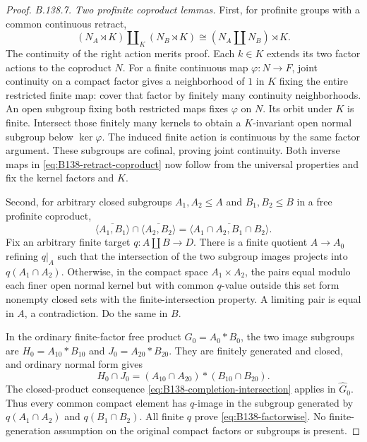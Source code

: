 \begin{proof}
\emph{B.138.7. Two profinite coproduct lemmas.}
First, for profinite groups with a common continuous retract,
\begin{equation}\label{eq:B138-retract-coproduct}
(N_A\rtimes K)\amalg_K(N_B\rtimes K)
       \cong(N_A\amalg N_B)\rtimes K.
\end{equation}
The continuity of the right action merits proof. Each $k\in K$
extends its two factor actions to the coproduct $N$. For a finite
continuous map $\varphi:N\to F$, joint continuity on a compact
factor gives a neighborhood of $1$ in $K$ fixing the entire restricted
finite map: cover that factor by finitely many continuity neighborhoods.
An open subgroup fixing both restricted maps fixes $\varphi$ on $N$.
Its orbit under $K$ is finite. Intersect those finitely many kernels
to obtain a $K$-invariant open normal subgroup below $\ker\varphi$.
The induced finite action is continuous by the same factor argument.
These subgroups are cofinal, proving joint continuity. Both inverse
maps in \eqref{eq:B138-retract-coproduct} now follow from the
universal properties and fix the kernel factors and $K$.

Second, for arbitrary closed subgroups $A_1,A_2\le A$ and
$B_1,B_2\le B$ in a free profinite coproduct,
\begin{equation}\label{eq:B138-factorwise}
\overline{\langle A_1,B_1\rangle}\cap
\overline{\langle A_2,B_2\rangle}
=\overline{\langle A_1\cap A_2,B_1\cap B_2\rangle}.
\end{equation}
Fix an arbitrary finite target $q:A\amalg B\to D$.
There is a finite quotient $A\to A_0$ refining $q|_A$ such that
the intersection of the two subgroup images projects into
$q(A_1\cap A_2)$. Otherwise, in the compact space $A_1\times A_2$,
the pairs equal modulo each finer open normal kernel but with common
$q$-value outside this set form nonempty closed sets with the
finite-intersection property. A limiting pair is equal in $A$,
a contradiction. Do the same in $B$.

In the ordinary finite-factor free product $G_0=A_0*B_0$, the
two image subgroups are $H_0=A_{10}*B_{10}$ and $J_0=A_{20}*B_{20}$.
They are finitely generated and closed, and ordinary normal form gives
\[
H_0\cap J_0=(A_{10}\cap A_{20})*(B_{10}\cap B_{20}).
\]
The closed-product consequence \eqref{eq:B138-completion-intersection}
applies in $\widehat G_0$. Thus every common compact element has
$q$-image in the subgroup generated by $q(A_1\cap A_2)$ and
$q(B_1\cap B_2)$. All finite $q$ prove \eqref{eq:B138-factorwise}.
No finite-generation assumption on the original compact factors or
subgroups is present.


\end{proof}
